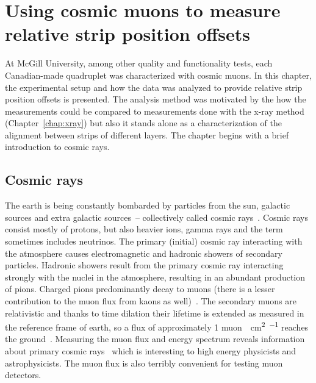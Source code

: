
\chapter{Using cosmic muons to measure relative strip position offsets}
\label{chap:cosmics}

At McGill University, among other quality and functionality tests, each Canadian-made quadruplet was characterized with cosmic muons. In this chapter, the experimental setup and how the data was analyzed to provide relative strip position offsets is presented. The analysis method was motivated by the how the measurements could be compared to measurements done with the x-ray method (Chapter~\ref{chap:xray}) but also it stands alone as a characterization of the alignment between strips of different layers. The chapter begins with a brief introduction to cosmic rays.

\section{Cosmic rays}

The earth is being constantly bombarded by particles from the sun, galactic sources and extra galactic sources~-- collectively called cosmic rays~\cite{boezio_chemical_2012, zyla_review_2020}. Cosmic rays consist mostly of protons, but also heavier ions, gamma rays and the term sometimes includes neutrinos. The primary (initial) cosmic ray interacting with the atmosphere causes electromagnetic and hadronic showers of secondary particles. Hadronic showers result from the primary cosmic ray interacting strongly with the nuclei in the atmosphere, resulting in an abundant production of pions. Charged pions predominantly decay to muons (there is a lesser contribution to the muon flux from kaons as well)~\cite{grieder_cosmic_2001}. The secondary muons are relativistic and thanks to time dilation their lifetime is extended as measured in the reference frame of earth, so a flux of approximately 1 muon\SI{}{\per\cm\squared\per\min} reaches the ground~\cite{zyla_review_2020}. Measuring the muon flux and energy spectrum reveals information about primary cosmic rays~\cite{grieder_cosmic_2001} which is interesting to high energy physicists and astrophysicists. The muon flux is also terribly convenient for testing muon detectors.


